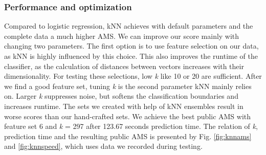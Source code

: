 \subsubsection{Performance and optimization}
Compared to logistic regression, kNN achieves with default parameters and the complete data a much higher AMS. We can improve our score mainly with changing two parameters. The first option is to use feature selection on our data, as kNN is highly influenced by this choice. This also improves the runtime of the classifier, as the calculation of distances between vectors increases with their dimensionality. For testing these selections, low \emph{k} like 10 or 20 are sufficient. After we find a good feature set, tuning \emph{k} is the second parameter kNN mainly relies on. Larger \emph{k} suppresses noise, but softens the classification boundaries and increases runtime. The sets we created with help of kNN ensembles result in worse scores than our hand-crafted sets. We achieve the best public AMS with feature set 6 and \emph{k} = 297 after 123.67 seconds prediction time. The relation of \emph{k}, prediction time and the resulting public AMS is presented by Fig. \ref{fig:knnams} and \ref{fig:knnspeed}, which uses data we recorded during testing.

